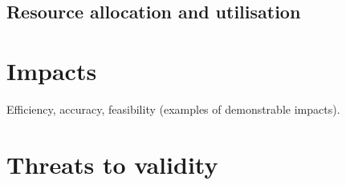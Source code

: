 \subsection{Resource allocation and utilisation}



\section{Impacts}
Efficiency, accuracy, feasibility (examples of demonstrable impacts).
\section{Threats to validity}